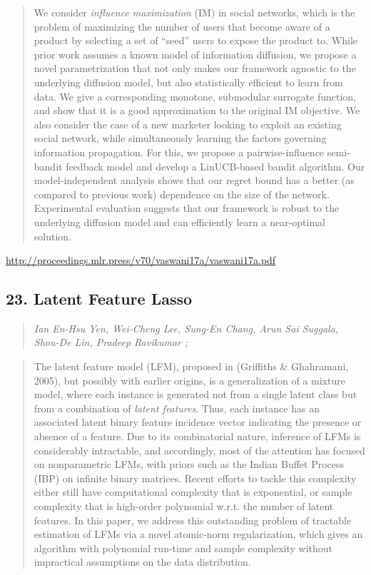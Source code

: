 \documentclass{article}
\begin{document}
\begin{quote}
    We consider \textit{influence maximization} (IM) in social networks, which is the problem of maximizing the number of users that become aware of a product by selecting a set of “seed” users to expose the product to. While prior work assumes a known model of information diffusion, we propose a novel parametrization that not only makes our framework agnostic to the underlying diffusion model, but also statistically efficient to learn from data. We give a corresponding monotone, submodular surrogate function, and show that it is a good approximation to the original IM objective. We also consider the case of a new marketer looking to exploit an existing social network, while simultaneously learning the factors governing information propagation. For this, we propose a pairwise-influence semi-bandit feedback model and develop a LinUCB-based bandit algorithm. Our model-independent analysis shows that our regret bound has a better (as compared to previous work) dependence on the size of the network. Experimental evaluation suggests that our framework is robust to the underlying diffusion model and can efficiently learn a near-optimal solution.  
\end{quote}

\href{http://proceedings.mlr.press/v70/vaswani17a/vaswani17a.pdf}{http://proceedings.mlr.press/v70/vaswani17a/vaswani17a.pdf}

\subsection{23. Latent Feature Lasso}

\begin{quote}
\footnotesize{\textit{Ian En-Hsu Yen, Wei-Cheng Lee, Sung-En Chang, Arun Sai Suggala, Shou-De Lin, Pradeep Ravikumar ;}}

\end{quote}

\begin{quote}
    The latent feature model (LFM), proposed in (Griffiths \& Ghahramani, 2005), but possibly with earlier origins, is a generalization of a mixture model, where each instance is generated not from a single latent class but from a combination of \textit{latent features}. Thus, each instance has an associated latent binary feature incidence vector indicating the presence or absence of a feature. Due to its combinatorial nature, inference of LFMs is considerably intractable, and accordingly, most of the attention has focused on nonparametric LFMs, with priors such as the Indian Buffet Process (IBP) on infinite binary matrices. Recent efforts to tackle this complexity either still have computational complexity that is exponential, or sample complexity that is high-order polynomial w.r.t. the number of latent features. In this paper, we address this outstanding problem of tractable estimation of LFMs via a novel atomic-norm regularization, which gives an algorithm with polynomial run-time and sample complexity without impractical assumptions on the data distribution.  
\end{quote}
\end{document}
